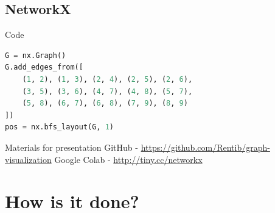 \documentclass[11pt]{beamer}
\begin{document}
\subsection{NetworkX}
\begin{frame}{\subsecname}
\begin{figure}
\resizebox{0.8\textwidth}{!}{}
\end{figure}
\end{frame}

\begin{frame}[fragile]{\subsecname}{Code}
    \begin{block}{}
        \begin{lstlisting}[language=python]
G = nx.Graph()
G.add_edges_from([
    (1, 2), (1, 3), (2, 4), (2, 5), (2, 6),
    (3, 5), (3, 6), (4, 7), (4, 8), (5, 7),
    (5, 8), (6, 7), (6, 8), (7, 9), (8, 9)
])
pos = nx.bfs_layout(G, 1)
        \end{lstlisting}
    \end{block}

    \pause

    \begin{block}{Materials for presentation}
        GitHub - \url{https://github.com/Rentib/graph-visualization}
        Google Colab - \url{http://tiny.cc/networkx}
    \end{block}

\end{frame}

\section{How is it done?}
\begin{frame}{\secname}
    \tableofcontents[currentsection,hideothersubsections,sectionstyle=hide]
\end{frame}
\end{document}
